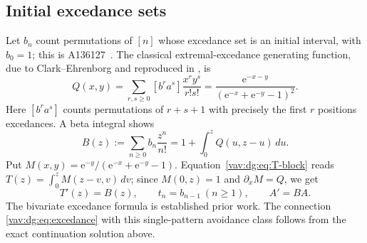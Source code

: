 \documentclass[11pt]{article}
\theoremstyle{remark}\newtheorem{remark}[theorem]{Remark}
\newcommand{\ee}{\mathrm e}
\begin{document}
\subsection{Initial excedance sets}\label{vav:dg:sec:excedance}
Let $b_n$ count permutations of $[n]$ whose excedance set is an initial
interval, with $b_0=1$; this is A136127~\cite{oeis136}.
The classical extremal-excedance generating function, due to
Clark--Ehrenborg and reproduced in \cite[Eq.~(3.1)]{excedance}, is
\[
 Q(x,y)=\sum_{r,s\ge0}[b^ra^s]\frac{x^ry^s}{r!s!}
       =\frac{\ee^{-x-y}}{(\ee^{-x}+\ee^{-y}-1)^2}.
\]
Here $[b^ra^s]$ counts permutations of $r+s+1$ with precisely the first
$r$ positions excedances. A beta integral shows
\[
 B(z):=\sum_{n\ge0}b_n\frac{z^n}{n!}
       =1+\int_0^zQ(u,z-u)\,du.
\]
Put $M(x,y)=\ee^{-y}/(\ee^{-x}+\ee^{-y}-1)$.
Equation~\eqref{vav:dg:eq:T-block} reads
$T(z)=\int_0^zM(z-v,v)\,dv$; since $M(0,z)=1$ and
$\partial_xM=Q$, we get
\begin{equation}\label{vav:dg:eq:excedance}
 T'(z)=B(z),\qquad t_n=b_{n-1}\ (n\ge1),\qquad A'=BA.
\end{equation}
The bivariate excedance formula is established prior work. The connection
\eqref{vav:dg:eq:excedance} with this single-pattern avoidance class follows from
the exact continuation solution above.
\end{document}
